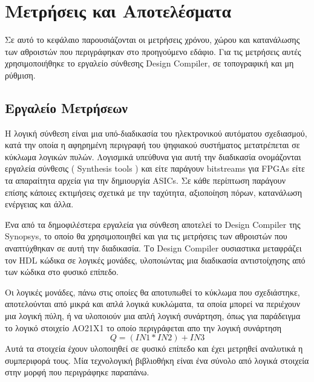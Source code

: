 \section{Μετρήσεις και Αποτελέσματα}

Σε αυτό το κεφάλαιο παρουσιάζονται οι μετρήσεις χρόνου, χώρου και κατανάλωσης των αθροιστών 
που περιγράφηκαν στο προηγούμενο εδάφιο. Για τις μετρήσεις αυτές χρησιμοποιήθηκε το εργαλείο
σύνθεσης Design Compiler, σε τοπογραφική και μη ρύθμιση.







\subsection{Εργαλείο Μετρήσεων}

Η λογική σύνθεση είναι μια υπό-διαδικασία του ηλεκτρονικού αυτόματου σχεδιασμού,
κατά την οποία η αφηρημένη περιγραφή του ψηφιακού συστήματος 
μετατρέπεται σε κύκλωμα λογικών πυλών. Λογισμικά υπεύθυνα για αυτή την διαδικασία
ονομάζονται εργαλεία σύνθεσις ( Synthesis tools ) και είτε παράγουν bitstreams για FPGAs
είτε τα απαραίτητα αρχεία για την δημιουργία ASICs. Σε κάθε περίπτωση παράγουν
επίσης κάποιες εκτιμήσεις σχετικά με την ταχύτητα, αξιοποίηση πόρων, κατανάλωση ενέργειας
και άλλα.

Ένα από τα δημοφιλέστερα εργαλεία για σύνθεση αποτελεί το Design Compiler της Synopsys,
το οποίο θα χρησιμοποιηθεί και για τις μετρήσεις των αθροιστών που αναπτύχθηκαν σε
αυτή την διαδικασία. Το Design Compiler ουσιαστικα μεταφράζει τον HDL κώδικα σε λογικές
μονάδες, υλοποιώντας μια διαδικασία αντιστοίχησης από των κώδικα στο φυσικό επίπεδο.

Οι λογικές μονάδες, πάνω στις οποίες θα αποτυπωθεί το κύκλωμα που σχεδιάστηκε, 
αποτελούνται από μικρά και απλά λογικά κυκλώματα, τα οποία μπορεί να περιέχουν 
μια λογική πύλη, ή να υλοποιούν μια απλή λογική συνάρτηση, όπως για παράδειγμα 
το λογικό στοιχείο AO21X1 το οποίο περιγράφεται απο την λογική συνάρτηση
\begin{equation*}
    Q = ( IN1 * IN2 ) + IN3
\end{equation*}
Αυτά τα στοιχεία έχουν υλοποιηθεί σε φυσικό επίπεδο και έχει μετρηθεί αναλυτικά η συμπεριφορά
τους. Μία τεχνολογική βιβλιοθήκη είναι ένα σύνολο από λογικά στοιχεία στην μορφή που περιγράφηκε
παραπάνω. 

